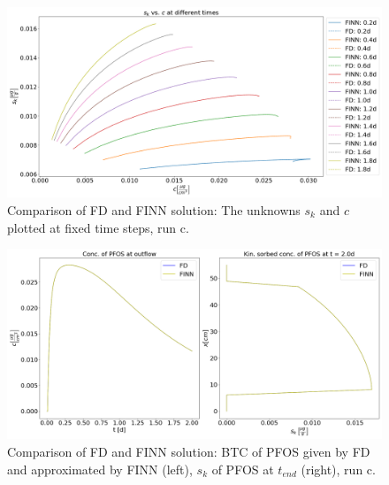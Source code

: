 \begin{figure}[h!]
    \centering
    \includegraphics[width=\textwidth]{images/res_sorp_synt_pparam.png}
    \caption[Comparison of FD and FINN sorption behavior, run c]{Comparison of FD and FINN solution: The unknowns $s_k$ and $c$ plotted at fixed time steps, run c.}
    \label{fig:res_sorp_synt_pparam}
\end{figure}
\begin{figure}[h!]
    \centering
    \includegraphics[width=\textwidth]{images/res_btc_synt_pparam.png}
    \caption[Comparison of FD and FINN BTC, run c]{Comparison of FD and FINN solution: BTC of PFOS given by FD and approximated by FINN (left), $s_k$ of PFOS at $t_{end}$ (right), run c.}
    \label{fig:res_btc_synt_pparam}
\end{figure}
\FloatBarrier
